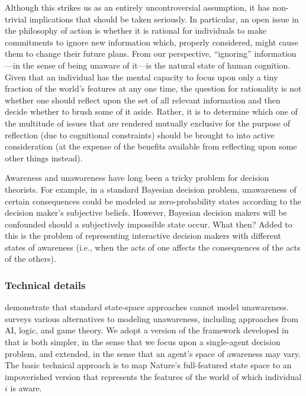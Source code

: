 \documentclass[
11pt,
titlepage,
reqno,
]{article}%
\theoremstyle{definition}
\begin{document}
Although this strikes us as an entirely uncontroversial assumption, it has non-trivial implications that should be taken seriously.
In particular, an open issue in the philosophy of action is whether it is rational for individuals to make commitments to ignore new information which, properly considered, might cause them to change their future plans.
From our perspective, ``ignoring'' information---in the sense of being unaware of it---is the natural state of human cognition.
Given that an individual has the mental capacity to focus upon only a tiny fraction of the world's features at any one time, the question for rationality is not whether one should reflect upon the set of all relevant information and then decide whether to brush some of it aside.
Rather, it is to determine which one of the multitude of issues that are rendered mutually exclusive for the purpose of reflection (due to cognitional constraints) should be brought to into active consideration (at the expense of the benefits available from reflecting upon some other things instead).
 
Awareness and unawareness have long been a tricky problem for decision theorists. 
For example, in a standard Bayesian decision problem, unawareness of certain consequences could be modeled as zero-probability states according to the decision maker's subjective beliefs. 
However, Bayesian decision makers will be confounded should a subjectively impossible state occur. 
What then?
Added to this is the problem of representing interactive decision makers with different states of awareness (i.e., when the acts of one affects the consequences of the acts of the others). 
 
 
\subsubsection{Technical details}
\citet{Dekel1998} demonstrate that standard state-space approaches cannot model unawareness. 
\citet{Schipper2015} surveys various alternatives to modeling unawareness, including approaches from  AI, logic, and game theory. 
We adopt a version of the framework developed in \citet{Heifetz2006} \citep[also see][for related extensions]{Heifetz2008,Heifetz2013} that is both simpler, in the sense that we focus upon a single-agent decision problem, and extended, in the sense that an agent's space of awareness may vary.
The basic technical approach is to map Nature's full-featured state space to an impoverished version that represents the features of the world of which individual $i$ is aware.
\end{document}
